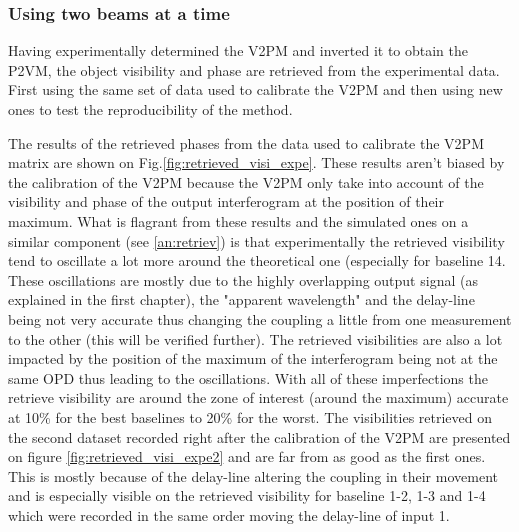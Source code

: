 
\subsubsection{Using two beams at a time}
Having experimentally determined the V2PM and inverted it to obtain the P2VM, the object visibility and phase are retrieved from the experimental  data. First using the same set of data used to calibrate the V2PM and then using new ones to test the reproducibility of the method. 

The results of the retrieved phases from the data used to calibrate the V2PM matrix are shown on Fig.\ref{fig:retrieved_visi_expe}. These results aren't biased by the calibration of the V2PM because the V2PM only take into account of the visibility and phase of the output interferogram at the position of their maximum. What is flagrant from these results and the simulated ones on a similar component (see \ref{an:retriev}) is that experimentally the retrieved visibility tend to oscillate a lot more around the theoretical one (especially for baseline 14. These oscillations are mostly due to the highly overlapping output signal (as explained in the first chapter), the "apparent wavelength" and the delay-line being not very accurate thus changing the coupling a little from one measurement to the other (this will be verified further). The retrieved visibilities are also a lot impacted by the position of the maximum of the interferogram being not at the same OPD thus leading to the oscillations. With all of these imperfections the retrieve visibility are around the zone of interest (around the maximum) accurate at 10\% for the best baselines to 20\% for the worst. The visibilities retrieved on the second dataset recorded right after the calibration of the V2PM are presented on figure \ref{fig:retrieved_visi_expe2} and are far from as good as the first ones. This is mostly because of the delay-line altering the coupling in their movement and is especially visible on the retrieved visibility for baseline 1-2, 1-3 and 1-4 which were recorded in the same order moving the delay-line of input 1.  


